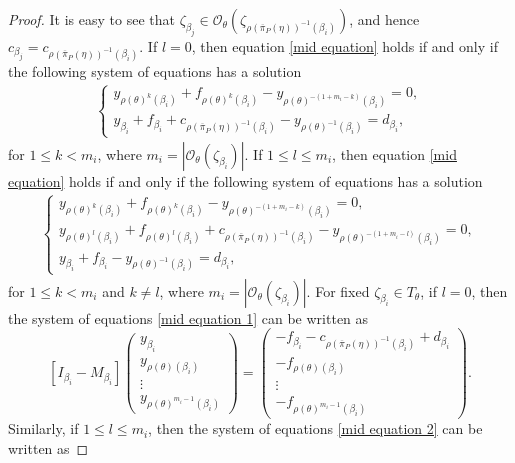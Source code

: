 \documentclass[10pt,a4paper]{amsart}
\begin{document}
\begin{proof}
It is easy to see that $\zeta_{\beta_j}\in \mathcal{O}_{\theta}(\zeta_{\rho(\overline{\pi}_P(\eta))^{-1}(\beta_i)})$, and hence $c_{\beta_j} = c_{\rho(\overline{\pi}_P(\eta))^{-1}(\beta_i)}$. If $l=0$, then equation \eqref{mid equation} holds if and only if the following system of equations has a solution 
\begin{align}\label{mid equation 1}
\begin{cases}
y_{\rho(\theta)^k(\beta_i)}+f_{\rho(\theta)^k(\beta_i)}-y_{\rho(\theta)^{-(1+m_i-k)}(\beta_i)}=0,\\
y_{\beta_i}+f_{\beta_i}+c_{\rho(\overline{\pi}_P(\eta))^{-1}(\beta_i)}-y_{\rho(\theta)^{-1}(\beta_i)}=d_{\beta_i},	
\end{cases} 
\end{align}
for $1\le k<m_i$, where $m_i=|\mathcal{O}_{\theta}(\zeta_{\beta_i})|$. If $1\leq l \leq m_i$, then equation \eqref{mid equation} holds if and only if the following system of equations has a solution 
\begin{align}\label{mid equation 2}
\begin{cases}
y_{\rho(\theta)^k(\beta_i)}+f_{\rho(\theta)^k(\beta_i)}-y_{\rho(\theta)^{-(1+m_i-k)}(\beta_i)}=0,\\
y_{\rho(\theta)^l(\beta_i)}+f_{\rho(\theta)^l(\beta_i)}+c_{\rho(\overline{\pi}_P(\eta))^{-1}(\beta_i)}-y_{\rho(\theta)^{-(1+m_i-l)}(\beta_i)}=0,\\
y_{\beta_i}+f_{\beta_i}-y_{\rho(\theta)^{-1}(\beta_i)}=d_{\beta_i},	
\end{cases} 
\end{align}
for $1\le k<m_i$ and $k\not=l$, where $m_i=|\mathcal{O}_{\theta}(\zeta_{\beta_i})|$.  For fixed $\zeta_{\beta_i}\in T_{\theta}$, if $l=0$, then the system of equations \eqref{mid equation 1} can be written as
$$
[I_{\beta_i}-M_{\beta_i}]
\left(\begin{matrix}
	y_{\beta_i}\\
	y_{\rho(\theta)(\beta_i)}\\
	\vdots\\
	y_{\rho(\theta)^{m_{i}-1}(\beta_i)}
\end{matrix}\right)=
\left(\begin{matrix}	-f_{\beta_i}-c_{\rho(\overline{\pi}_P(\eta))^{-1}(\beta_i)}+d_{\beta_i}\\
	-f_{\rho(\theta)(\beta_i)}\\
	\vdots\\
	-f_{\rho(\theta)^{m_{i}-1}(\beta_i)}
\end{matrix}\right).
$$ 
Similarly, if $1\leq l \leq m_i$, then the system of equations \eqref{mid equation 2} can be written as

\end{proof}
\end{document}
